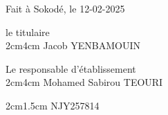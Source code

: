 \documentclass[a4paper, landscape, 10pt]{article}
\begin{document}
Fait à Sokodé, le 12-02-2025 \\

\vspace{0.5cm}

\def \vspace{2cm}
\noindent
\begin{minipage}{0.49\textwidth}
	\begin{center}
		le titulaire\\
		\vspace{4cm}
		Jacob YENBAMOUIN
	\end{center}
\end{minipage}\hfill
\begin{minipage}{0.49\textwidth}
	\begin{center}
		Le responsable d'établissement\\
		\vspace{4cm}
		Mohamed Sabirou TEOURI
	\end{center}
\end{minipage}

\vspace{1.5cm}
\noindent
N\degre JY257814
\end{document}
